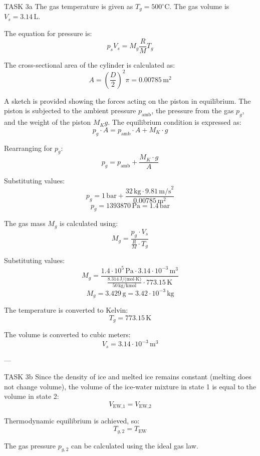 TASK 3a  
The gas temperature is given as \( T_g = 500^\circ\text{C} \).  
The gas volume is \( V_s = 3.14 \, \text{L} \).  

The equation for pressure is:  
\[
p_s V_s = M_g \frac{R}{M} T_g
\]  

The cross-sectional area of the cylinder is calculated as:  
\[
A = \left( \frac{D}{2} \right)^2 \pi = 0.00785 \, \text{m}^2
\]  

A sketch is provided showing the forces acting on the piston in equilibrium. The piston is subjected to the ambient pressure \( p_{\text{amb}} \), the pressure from the gas \( p_g \), and the weight of the piston \( M_K g \). The equilibrium condition is expressed as:  
\[
p_g \cdot A = p_{\text{amb}} \cdot A + M_K \cdot g
\]  

Rearranging for \( p_g \):  
\[
p_g = p_{\text{amb}} + \frac{M_K \cdot g}{A}
\]  

Substituting values:  
\[
p_g = 1 \, \text{bar} + \frac{32 \, \text{kg} \cdot 9.81 \, \text{m/s}^2}{0.00785 \, \text{m}^2}
\]  
\[
p_g = 1393870 \, \text{Pa} = 1.4 \, \text{bar}
\]  

The gas mass \( M_g \) is calculated using:  
\[
M_g = \frac{p_g \cdot V_s}{\frac{R}{M} \cdot T_g}
\]  

Substituting values:  
\[
M_g = \frac{1.4 \cdot 10^5 \, \text{Pa} \cdot 3.14 \cdot 10^{-3} \, \text{m}^3}{\frac{8.314 \, \text{J/(mol·K)}}{50 \, \text{kg/kmol}} \cdot 773.15 \, \text{K}}
\]  
\[
M_g = 3.429 \, \text{g} = 3.42 \cdot 10^{-3} \, \text{kg}
\]  

The temperature is converted to Kelvin:  
\[
T_g = 773.15 \, \text{K}
\]  

The volume is converted to cubic meters:  
\[
V_s = 3.14 \cdot 10^{-3} \, \text{m}^3
\]  

---

TASK 3b  
Since the density of ice and melted ice remains constant (melting does not change volume), the volume of the ice-water mixture in state 1 is equal to the volume in state 2:  
\[
V_{\text{EW,1}} = V_{\text{EW,2}}
\]  

Thermodynamic equilibrium is achieved, so:  
\[
T_{g,2} = T_{\text{EW}}
\]  

The gas pressure \( p_{g,2} \) can be calculated using the ideal gas law.